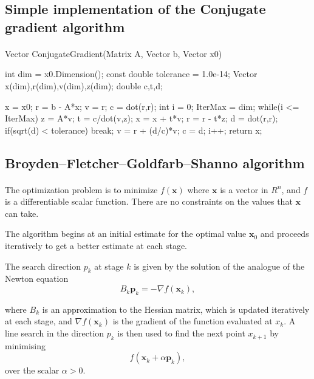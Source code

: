\documentclass[%
oneside,                 %
final,                   %
10pt]{article}
\begin{document}
\subsection{Simple implementation of the Conjugate gradient algorithm}

\paragraph{}
\bcppcod
  Vector ConjugateGradient(Matrix A, Vector b, Vector x0){
  int dim = x0.Dimension();
  const double tolerance = 1.0e-14;
  Vector x(dim),r(dim),v(dim),z(dim);
  double c,t,d;

  x = x0;
  r = b - A*x;
  v = r;
  c = dot(r,r);
  int i = 0; IterMax = dim;
  while(i <= IterMax){
    z = A*v;
    t = c/dot(v,z);
    x = x + t*v;
    r = r - t*z;
    d = dot(r,r);
    if(sqrt(d) < tolerance)
      break;
    v = r + (d/c)*v;
    c = d;  i++;
  }
  return x;
} 
\ecppcod




\subsection{Broyden–Fletcher–Goldfarb–Shanno algorithm}

\paragraph{}
The optimization problem is to minimize $f(\mathbf {x} )$ where $\mathbf {x}$  is a vector in $R^{n}$, and $f$ is a differentiable scalar function. There are no constraints on the values that  $\mathbf {x}$  can take.

The algorithm begins at an initial estimate for the optimal value $\mathbf {x}_{0}$ and proceeds iteratively to get a better estimate at each stage.

The search direction $p_k$ at stage $k$ is given by the solution of the analogue of the Newton equation
\[
B_{k}\mathbf {p} _{k}=-\nabla f(\mathbf {x}_{k}),
\]

where $B_{k}$ is an approximation to the Hessian matrix, which is
updated iteratively at each stage, and $\nabla f(\mathbf {x} _{k})$
is the gradient of the function
evaluated at $x_k$. 
A line search in the direction $p_k$ is then used to
find the next point $x_{k+1}$ by minimising 
\[
f(\mathbf {x}_{k}+\alpha \mathbf {p}_{k}),
\]
over the scalar $\alpha > 0$.
\end{document}
